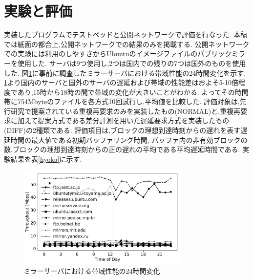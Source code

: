 \documentclass{ltjsarticle}
\begin{document}
\section{実験と評価}
\vspace{-2mm}
実装したプログラムでテストベッドと公開ネットワークで評価を行なった.
本稿では紙面の都合上,公開ネットワークでの結果のみを掲載する.
公開ネットワークでの実験には利用のしやすさからUbuntuのイメージファイルのパブリックミラーを使用した.
サーバは9つ使用し,2つは国内での残りの7つは国外のものを使用した.
図\ref{mirror}に事前に調査したミラーサーバにおける帯域性能の24時間変化を示す.
\ref{mirror}より国内のサーバと国外のサーバの遅延および帯域の性能差はおよそ5-10倍程度であり,15時から18時の間で帯域の変化が大きいことがわかる.
よってその時間帯に754Mbyteのファイルを各方式10回試行し,平均値を比較した.
評価対象は,先行研究で提案されている重複再要求のみを実装したもの(NORMAL)と,重複再要求に加えて提案方式である差分計測を用いた遅延要求方式を実装したもの(DIFF)の2種類である.
評価項目は,ブロックの理想到達時刻からの遅れを表す遅延時間の最大値である初期バッファリング時間,
バッファ内の非有効ブロックの数,ブロックの理想到達時刻からの正の遅れの平均である平均遅延時間である.
実験結果を表\ref{hyoka}に示す.
\vspace{-7mm}
\begin{table}[htb]
	\begin{center}
		\caption{実験結果}
		\label{hyoka}
		\vspace{-3mm}
	\end{center}
\end{table}
\vspace{-15mm}
\begin{figure}[h]
	\centering
	\includegraphics[width=8.5cm]{figure/thp24h-g.pdf}
	\vspace{-9mm}
	\caption{ミラーサーバにおける帯域性能の24時間変化}
	\label{mirror}
\end{figure}
\vspace{-4mm}
\end{document}
